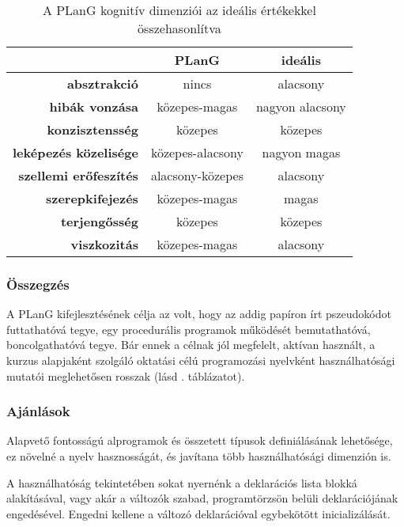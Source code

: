 \begin{table}[tb]
	\centering
	\begin{tabular}{ r c c }
						& \bfseries PLanG	 & \bfseries ideális \\\hline
		\bfseries absztrakció 		&\cellcolor{red!30}nincs & alacsony \\
		\bfseries hibák vonzása 	&\cellcolor{red!30}közepes-magas & nagyon alacsony \\
		\bfseries konzisztensség 	&\cellcolor{blue!30}közepes & közepes  \\
		\bfseries leképezés közelisége &\cellcolor{red!30}közepes-alacsony & nagyon magas \\
		\bfseries szellemi erőfeszítés &\cellcolor{green!30}alacsony-közepes & alacsony \\
		\bfseries szerepkifejezés &\cellcolor{green!30}közepes-magas	& magas \\
		\bfseries terjengősség &\cellcolor{blue!30}közepes	& közepes \\
		\bfseries viszkozitás &\cellcolor{red!30}közepes-magas	& alacsony
	\end{tabular}
	\caption{A PLanG kognitív dimenziói az ideális értékekkel összehasonlítva}
	\label{tab:plangminmut}
\end{table}

\subsubsection{Összegzés}
A PLanG kifejlesztésének célja az volt, hogy az addig papíron írt pszeudokódot futtathatóvá tegye, egy procedurális programok működését bemutathatóvá, boncolgathatóvá tegye\cite{lovei}.
Bár ennek a célnak jól megfelelt, aktívan használt, a kurzus alapjaként szolgáló oktatási célú programozási nyelvként használhatósági mutatói meglehetősen rosszak (lásd . táblázatot).


\subsubsection{Ajánlások}
Alapvető fontosságú alprogramok és összetett típusok definiálásának lehetősége, ez növelné a nyelv hasznosságát, és javítana több használhatósági dimenzión is.

A használhatóság tekintetében sokat nyernénk a deklarációs lista blokká alakításával, vagy akár a változók szabad, programtörzsön belüli deklarációjának engedésével. Engedni kellene a változó deklarációval egybekötött inicializálását.

